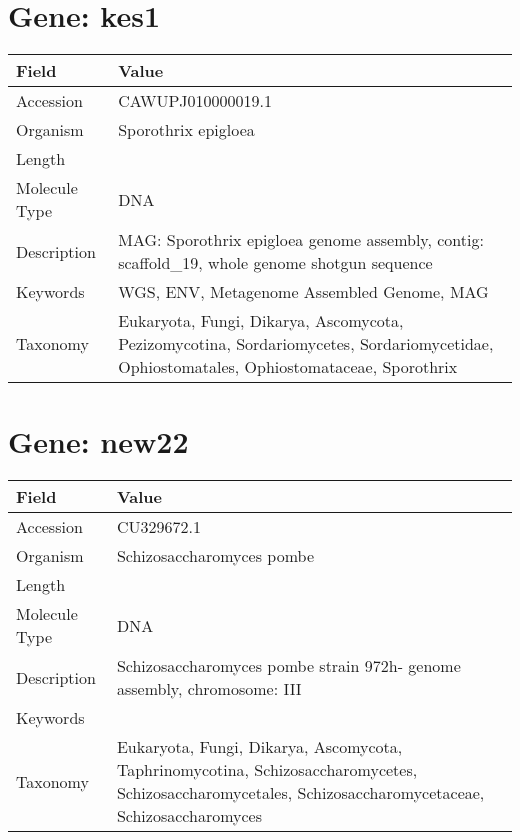 \documentclass[10pt]{article}
\begin{document}
\section*{Gene: kes1}
{\footnotesize
\begin{longtable}{>{\raggedright\arraybackslash}p{4.5cm} >{\raggedright\arraybackslash}p{11.5cm}}
\textbf{Field} & \textbf{Value} \\
\hline
Accession & CAWUPJ010000019.1 \\
Organism & Sporothrix epigloea \\
Length & 122865 \\
Molecule Type & DNA \\
Description & MAG: Sporothrix epigloea genome assembly, contig: scaffold\_19, whole genome shotgun sequence \\
Keywords & WGS, ENV, Metagenome Assembled Genome, MAG \\
Taxonomy & Eukaryota, Fungi, Dikarya, Ascomycota, Pezizomycotina, Sordariomycetes, Sordariomycetidae, Ophiostomatales, Ophiostomataceae, Sporothrix \\
\end{longtable}
}


\section*{Gene: new22}
{\footnotesize
\begin{longtable}{>{\raggedright\arraybackslash}p{4.5cm} >{\raggedright\arraybackslash}p{11.5cm}}
\textbf{Field} & \textbf{Value} \\
\hline
Accession & CU329672.1 \\
Organism & Schizosaccharomyces pombe \\
Length & 2452883 \\
Molecule Type & DNA \\
Description & Schizosaccharomyces pombe strain 972h- genome assembly, chromosome: III \\
Keywords &  \\
Taxonomy & Eukaryota, Fungi, Dikarya, Ascomycota, Taphrinomycotina, Schizosaccharomycetes, Schizosaccharomycetales, Schizosaccharomycetaceae, Schizosaccharomyces \\
\end{longtable}
}
\end{document}

